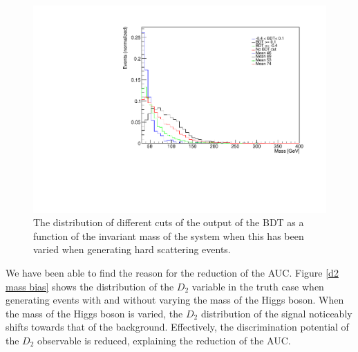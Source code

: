 \documentclass[10pt,a4paper]{book}
\begin{document}
\begin{figure}
\centering
\includegraphics[scale=0.6]{ch4_images/bdt_cuts_mass_bias}
\caption{The distribution of different cuts of the output of the BDT as a function of the invariant mass of the system when this has been varied when generating hard scattering events.}
\label{bdt inv mass}
\end{figure}

We have been able to find the reason for the reduction of the AUC. Figure \ref{d2 mass bias} shows the distribution of the $D_2$ variable in the truth case when generating events with and without varying the mass of the Higgs boson. When the mass of the Higgs boson is varied, the $D_2$ distribution of the signal noticeably shifts towards that of the background. Effectively, the discrimination potential of the $D_2$ observable is reduced, explaining the reduction of the AUC.
\end{document}
